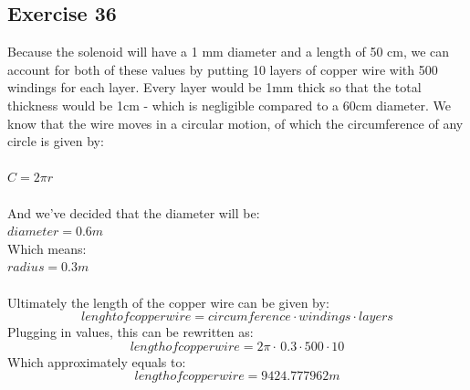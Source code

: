 \documentclass{article}
\begin{document}
\subsection{Exercise 36}
Because the solenoid will have a 1 mm diameter and a length of 50 cm, we can account for both of these values by putting 10 layers of copper wire with 500 windings for each layer. Every layer would be 1mm thick so that the total thickness would be 1cm - which is negligible compared to a 60cm diameter.
We know that the wire moves in a circular motion, of which the circumference of any circle is given by:
\\
\\
$C = 2 \mathit{\pi r}$
\\
\\
And we've decided that the diameter will be:
\\
$\mathit{diameter} =  0.6 m$
\\
Which means:
\\
$\mathit{radius} =  0.3 m$
\\
\\
Ultimately the length of the copper wire can be given by:
\begin{equation}
    \mathit{lenght} \mathit{of} \mathit{copper} \mathit{wire} = 
    \mathit{circumference} \cdot \mathit{windings} \cdot \mathit{layers}
\end{equation}
Plugging in values, this can be rewritten as:
\begin{equation}
    \mathit{length}\mathit{of}\mathit{copper}\mathit{wire}=2\pi\cdot \mathit{\,0.3}\cdot \mathit{500}\cdot \mathit{10}
\end{equation}
Which approximately equals to:
\begin{equation}
    \mathit{length} \mathit{of} \mathit{copper} \mathit{wire} = 
 9424.777962 m
\end{equation}
\end{document}
